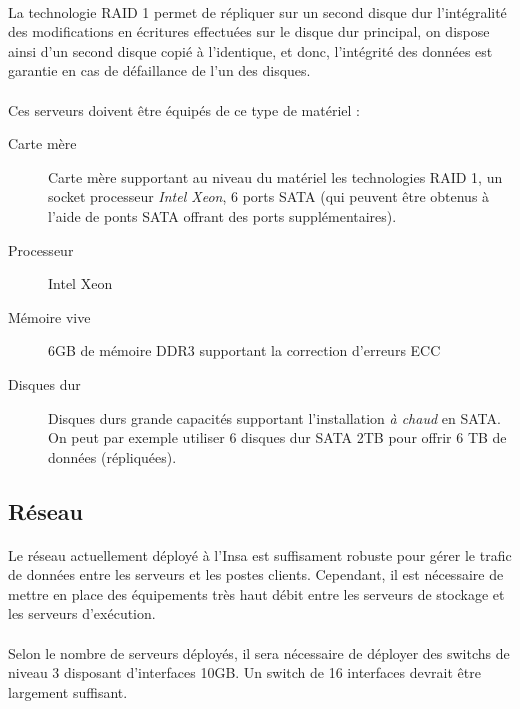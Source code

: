 \paragraph{} La technologie RAID 1 permet de répliquer sur un
second disque dur l'intégralité des modifications en écritures effectuées
sur le disque dur principal, on dispose ainsi d'un second disque copié à
l'identique, et donc, l'intégrité des données est garantie en cas de
défaillance de l'un des disques.

\paragraph{} Ces serveurs doivent être équipés de ce type de matériel :

\begin{description}
  \item[Carte mère] Carte mère supportant au niveau du matériel
    les technologies RAID 1, un socket processeur \emph{Intel Xeon}, 6 ports SATA
    (qui peuvent être obtenus à l'aide de ponts SATA offrant des ports
    supplémentaires).
  \item[Processeur] Intel Xeon
  \item[Mémoire vive] 6GB de mémoire DDR3 supportant la correction d'erreurs ECC
  \item[Disques dur] Disques durs grande capacités supportant l'installation
    \emph{à chaud} en SATA. On peut par exemple utiliser 6 disques dur SATA 2TB
    pour offrir 6 TB de données (répliquées).
\end{description}

\subsection{Réseau}

\paragraph{} Le réseau actuellement déployé à l'Insa est suffisament robuste
pour gérer le trafic de données entre les serveurs et les postes clients.
Cependant, il est nécessaire de mettre en place des équipements très haut débit
entre les serveurs de stockage et les serveurs d'exécution.

\paragraph{} Selon le nombre de serveurs déployés, il sera nécessaire de
déployer des switchs de niveau 3 disposant d'interfaces 10GB. Un switch de 16
interfaces devrait être largement suffisant.


